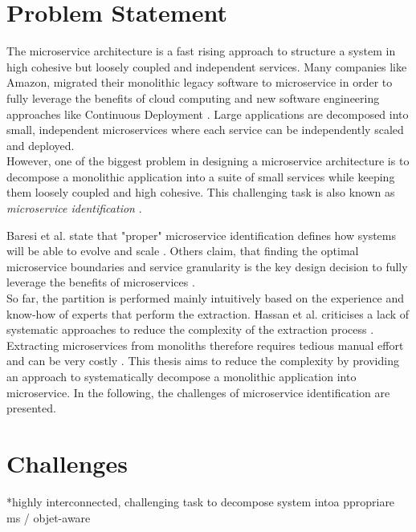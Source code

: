 \section{Problem Statement}
\label{sec:Introduction:ProblemStatement}
The microservice architecture is a fast rising approach to structure a system in high cohesive but loosely coupled and independent services. Many companies like Amazon, migrated their monolithic legacy software to microservice in order to fully leverage the benefits of cloud computing and new software engineering approaches like Continuous Deployment \cite{MigratingCloud}. Large applications are decomposed into small, independent microservices where each service can be independently scaled and deployed. 
\\
However, one of the biggest problem in designing a microservice architecture is to decompose a monolithic application into a suite of small services while keeping them loosely coupled and high cohesive. This challenging task is also known as \textit{microservice identification} \cite{ObjectAwareAmiri}.

Baresi et al. state that "proper" microservice identification defines how systems will be able to evolve and scale \cite{interfaceAnalysisBaresi}. Others claim, that finding the optimal microservice boundaries and service granularity is the key design decision to fully leverage the benefits of microservices \cite{ClassificationOfRefactoring} \cite{ArchitecturalMetaModelling}. 
\\
So far, the partition is performed mainly intuitively based on the experience and know-how of experts that perform the extraction. Hassan et al. criticises a lack of systematic approaches to reduce the complexity of the extraction process \cite{ArchitecturalMetaModelling}. Extracting microservices from monoliths therefore requires tedious manual effort and can be very costly \cite{FunctionalDecompositionHeinrich} \cite{ExtractionMazlami}. This thesis aims to reduce the complexity by providing an approach to systematically decompose a monolithic application into microservice. In the following, the challenges of microservice identification are presented.



\section{Challenges}
\label{sec:Introduction:Challenges}



*highly interconnected, challenging task to decompose system intoa ppropriare ms / objet-aware

